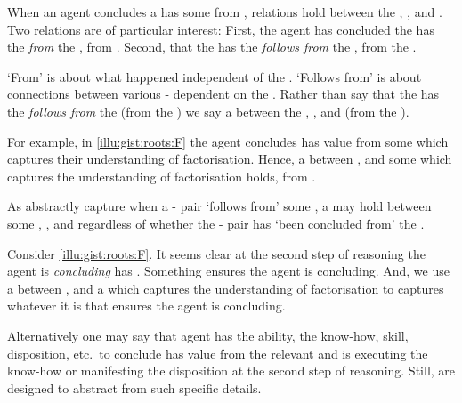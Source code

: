 \begin{note}
  When an agent concludes a  has some  from , relations hold between the , , and .
  Two relations are of particular interest:
  First, the agent has concluded the  has the  \emph{from} the , from .
  Second, that the  has the  \emph{follows from} the , from the \agpe{}.

  `From' is about what happened independent of the \agpe{}.
  `Follows from' is about connections between various - dependent on the \agpe{}.
  Rather than say that the  has the  \emph{follows from} the  (from the \agpe{}) we say a \ros{} between the , , and  (from the \agpe{}).

  For example, in \autoref{illu:gist:roots:F} the agent concludes \propM{\rootsCon{}} has value  from some \pool{} which captures their understanding of factorisation.
  Hence, a \ros{} between \propM{\rootsCon{}},  and some \pool{} which captures the \agents{} understanding of factorisation holds, from .
\end{note}


\begin{note}
  As  abstractly capture when a - pair `follows from' some \pool{}, a  may hold between some , , and \pool{} regardless of whether the - pair has `been concluded from' the \pool{}.

  Consider \autoref{illu:gist:roots:F}.
  It seems clear at the second step of reasoning the agent is \emph{concluding} \propM{\rootsCon{}} has \val{} .
  Something ensures the agent is concluding.
  And, we use a \ros{} between \propM{\rootsCon{}},  and a \pool{} which captures the \agents{} understanding of factorisation to captures whatever it is that ensures the agent is concluding.

  Alternatively one may say that agent has the ability, the know-how, skill, disposition, etc.\ to conclude \propM{\rootsCon{}} has value  from the relevant \pool{} and is executing the know-how or manifesting the disposition at the second step of reasoning.
  Still,  are designed to abstract from such specific details.
\end{note}


